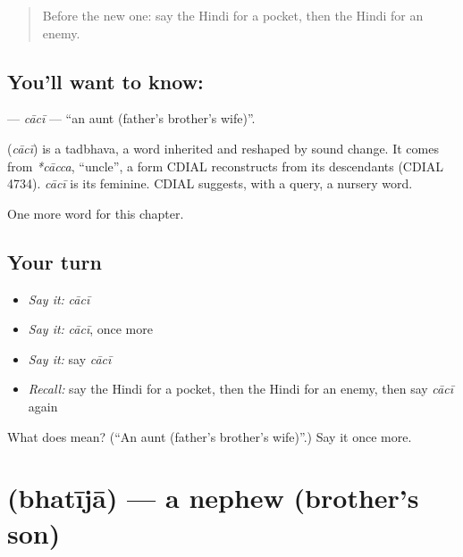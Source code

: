 \label{lesson:HI-C188-caci}



\begin{quote}
Before the new one: say the Hindi for a pocket, then the Hindi for an enemy.
\end{quote}

\subsection*{You'll want to know: }
\textbf{} — \emph{cācī} — \textquotedblleft{}an aunt (father's brother's wife)\textquotedblright{}.

\begin{cousinweb}
\textbf{} (\emph{cācī}) is a tadbhava, a word inherited and reshaped by sound change. It comes from \emph{*cācca}, \textquotedblleft{}uncle\textquotedblright{}, a form CDIAL reconstructs from its descendants (CDIAL 4734). \emph{cācī} is its feminine. CDIAL suggests, with a query, a nursery word.
\end{cousinweb}

\begin{grammarlens}[title={What you've built}]
One more word for this chapter.
\end{grammarlens}

\subsection*{Your turn}
\begin{itemize}
\raggedright
  \item \emph{Say it:} \emph{cācī}
  \item \emph{Say it:} \emph{cācī}, once more
  \item \emph{Say it:} say \emph{cācī}
  \item \emph{Recall:} say the Hindi for a pocket, then the Hindi for an enemy, then say \emph{cācī} again
\end{itemize}

\begin{tcolorbox}[breakable,colback=teal!4,colframe=teal!35!black,title={Before you move on}]
What does  mean? (\textquotedblleft{}An aunt (father's brother's wife)\textquotedblright{}.) Say it once more.
\end{tcolorbox}
\section[\texorpdfstring{\hi{भतीजा} (bhatījā)}{भतीजा (bhatījā)}]{ (bhatījā) — a nephew (brother's son)}

